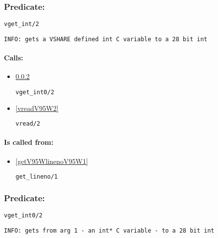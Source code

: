 \subsubsection{Predicate:} \label{vgetV95WintV95W2}

\begin{verbatim}
vget_int/2
\end{verbatim}

{\small \begin{verbatim}
INFO: gets a VSHARE defined int C variable to a 28 bit int

\end{verbatim}}
\paragraph{Calls:} 
\begin{itemize}
\item \ref{vgetV95Wint0V95W2} 
\begin{verbatim}
vget_int0/2
\end{verbatim}

\item \ref{vreadV95W2} 
\begin{verbatim}
vread/2
\end{verbatim}

\end{itemize}
\paragraph{Is called from:} 
\begin{itemize}
\item \ref{getV95WlinenoV95W1} 
\begin{verbatim}
get_lineno/1
\end{verbatim}

\end{itemize}

\subsubsection{Predicate:} \label{vgetV95Wint0V95W2}

\begin{verbatim}
vget_int0/2
\end{verbatim}

{\small \begin{verbatim}
INFO: gets from arg 1 - an int* C variable - to a 28 bit int

\end{verbatim}}
